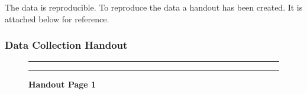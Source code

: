 \documentclass[]{article}
\begin{document}
The data is reproducible. To reproduce the data a handout has been
created. It is attached below for reference.

\newpage
\subsubsection{Data Collection Handout}
\label{sec:appendix-data-handout}

\begin{figure}[!ht]
    \hrule
    \caption{ \textbf{Handout Page 1} }
    \begin{center}
    \end{center}
    \label{fig:handout-1}
    \hrule
\end{figure}

\newpage
\end{document}
